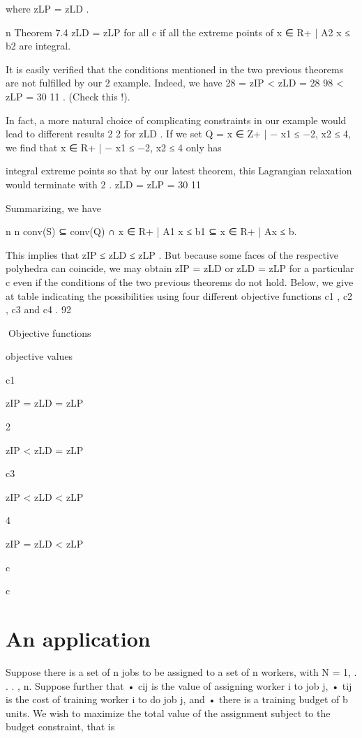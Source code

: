where zLP = zLD .

n
Theorem 7.4 zLD = zLP for all c if all the extreme points of {x ∈ R+
| A2 x ≤ b2 } are integral.

It is easily verified that the conditions mentioned in the two previous theorems are not fulfilled by our
2
example. Indeed, we have 28 = zIP < zLD = 28 98 < zLP = 30 11
. (Check this !).

In fact, a more natural choice of complicating constraints in our example would lead to different results
2
2
for zLD . If we set Q = {x ∈ Z+
| − x1 ≤ −2, x2 ≤ 4}, we find that {x ∈ R+
| − x1 ≤ −2, x2 ≤ 4} only has

integral extreme points so that by our latest theorem, this Lagrangian relaxation would terminate with
2
.
zLD = zLP = 30 11

Summarizing, we have

n
n
conv(S) ⊆ conv(Q) ∩ {x ∈ R+
| A1 x ≤ b1 } ⊆ {x ∈ R+
| Ax ≤ b}.

This implies that zIP ≤ zLD ≤ zLP . But because some faces of the respective polyhedra can coincide,
we may obtain zIP = zLD or zLD = zLP for a particular c even if the conditions of the two previous
theorems do not hold. Below, we give at table indicating the possibilities using four different objective
functions c1 , c2 , c3 and c4 .
92

Objective functions

objective values

c1

zIP = zLD = zLP

2

zIP < zLD = zLP

c3

zIP < zLD < zLP

4

zIP = zLD < zLP

c

c

\section{An application}

Suppose there is a set of n jobs to be assigned to a set of n workers, with N = {1, . . . , n}. Suppose
further that
• cij is the value of assigning worker i to job j,
• tij is the cost of training worker i to do job j, and
• there is a training budget of b units.
We wish to maximize the total value of the assignment subject to the budget constraint, that is

